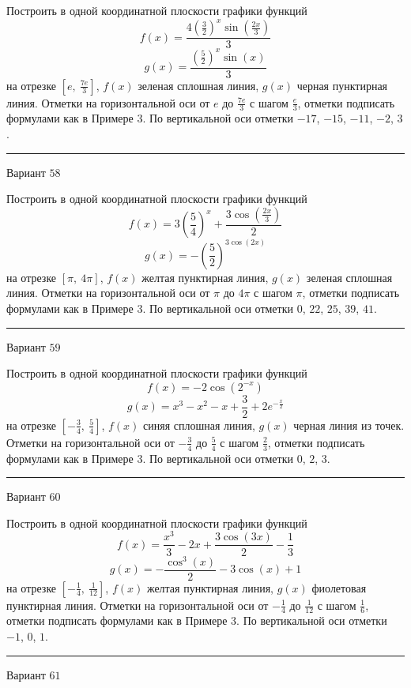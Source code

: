 \documentclass[11pt]{report}
\begin{document}
Построить в одной координатной плоскости графики функций $$f(x) = \frac{4 \left(\frac{3}{2}\right)^{x} \sin{\left(\frac{2 x}{3} \right)}}{3}$$ $$g(x) = \frac{\left(\frac{5}{2}\right)^{x} \sin{\left(x \right)}}{3}$$ на отрезке $\left[e, \  \frac{7 e}{3}\right]$, $f(x)$ зеленая сплошная линия, $g(x)$ черная пунктирная линия. Отметки на горизонтальной оси от $e$ до $\frac{7 e}{3}$ с шагом $\frac{e}{3}$, отметки подписать формулами как в Примере 3. По вертикальной оси отметки $-17$, $-15$, $-11$, $-2$, $3$.
\begin{center}
\noindent\rule{8cm}{0.4pt}
\end{center}
Вариант $58$


Построить в одной координатной плоскости графики функций $$f(x) = 3 \left(\frac{5}{4}\right)^{x} + \frac{3 \cos{\left(\frac{2 x}{3} \right)}}{2}$$ $$g(x) = - \left(\frac{5}{2}\right)^{3 \cos{\left(2 x \right)}}$$ на отрезке $\left[\pi, \  4 \pi\right]$, $f(x)$ желтая пунктирная линия, $g(x)$ зеленая сплошная линия. Отметки на горизонтальной оси от $\pi$ до $4 \pi$ с шагом $\pi$, отметки подписать формулами как в Примере 3. По вертикальной оси отметки $0$, $22$, $25$, $39$, $41$.
\begin{center}
\noindent\rule{8cm}{0.4pt}
\end{center}
Вариант $59$


Построить в одной координатной плоскости графики функций $$f(x) = - 2 \cos{\left(2^{- x} \right)}$$ $$g(x) = x^{3} - x^{2} - x + \frac{3}{2} + 2 e^{- \frac{x}{2}}$$ на отрезке $\left[- \frac{3}{4}, \  \frac{5}{4}\right]$, $f(x)$ синяя сплошная линия, $g(x)$ черная линия из точек. Отметки на горизонтальной оси от $- \frac{3}{4}$ до $\frac{5}{4}$ с шагом $\frac{2}{3}$, отметки подписать формулами как в Примере 3. По вертикальной оси отметки $0$, $2$, $3$.
\begin{center}
\noindent\rule{8cm}{0.4pt}
\end{center}
Вариант $60$


Построить в одной координатной плоскости графики функций $$f(x) = \frac{x^{3}}{3} - 2 x + \frac{3 \cos{\left(3 x \right)}}{2} - \frac{1}{3}$$ $$g(x) = - \frac{\cos^{3}{\left(x \right)}}{2} - 3 \cos{\left(x \right)} + 1$$ на отрезке $\left[- \frac{1}{4}, \  \frac{1}{12}\right]$, $f(x)$ желтая пунктирная линия, $g(x)$ фиолетовая пунктирная линия. Отметки на горизонтальной оси от $- \frac{1}{4}$ до $\frac{1}{12}$ с шагом $\frac{1}{6}$, отметки подписать формулами как в Примере 3. По вертикальной оси отметки $-1$, $0$, $1$.
\begin{center}
\noindent\rule{8cm}{0.4pt}
\end{center}
Вариант $61$
\end{document}
